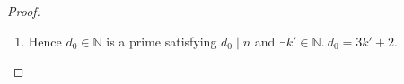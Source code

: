 \documentclass[12pt]{article}
\theoremstyle{definition}
\numberwithin{equation}{qn}
\newcommand{\nat}{\mathbb{N}}
\newenvironment{prf}
{
    \begin{proof}
        \hfill
        \begin{enumerate}[label*=\arabic*.]
                }
                {
                \hfill\qedsymbol
        \end{enumerate}
    \renewcommand{\qedsymbol}{}
    \end{proof}
}
\begin{document}
\begin{prf}
\begin{enumerate}[label=(\arabic*).]
        \item Without loss of generality, assume $\beta = 2, \delta = 1$, then
            $$a = 3\alpha + 2, \alpha\in\nat$$
            also notice that $a\mid d_0$ and $d_0\mid n$, so $a\mid n$ and as a result $a\in D$.
        \item However, from \eqref{eq:q12_1}, $a\mid d_0\implies a\leq d_0$,
            but $b\ne 1$ so we have $a \ne d_0$, then $a < d_0$, contradicting with $d_0$ being smallest in $D$.
    \end{enumerate}
\item Hence $d_0 \in\nat$ is a prime satisfying $d_0\mid n$ and $\exists k'\in\nat.~ d_0=3k'+2$.
\end{prf}
\end{document}
